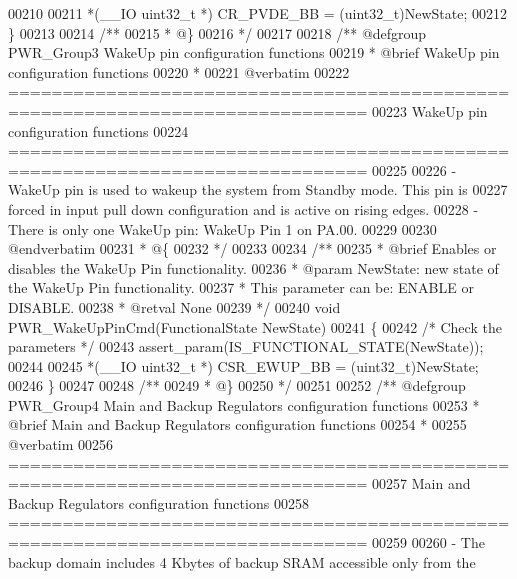 \begin{DoxyCode}
00210 
00211   *(\_\_IO uint32\_t *) CR_PVDE_BB = (uint32\_t)NewState;
00212 \}
00213 
00214 \textcolor{comment}{/**}
00215 \textcolor{comment}{  * @\}}
00216 \textcolor{comment}{  */}
00217 
00218 \textcolor{comment}{/** @defgroup PWR\_Group3 WakeUp pin configuration functions}
00219 \textcolor{comment}{ *  @brief   WakeUp pin configuration functions }
00220 \textcolor{comment}{ *}
00221 \textcolor{comment}{@verbatim   }
00222 \textcolor{comment}{ ===============================================================================}
00223 \textcolor{comment}{                    WakeUp pin configuration functions}
00224 \textcolor{comment}{ ===============================================================================  }
00225 \textcolor{comment}{}
00226 \textcolor{comment}{ - WakeUp pin is used to wakeup the system from Standby mode. This pin is }
00227 \textcolor{comment}{   forced in input pull down configuration and is active on rising edges.}
00228 \textcolor{comment}{ - There is only one WakeUp pin: WakeUp Pin 1 on PA.00.}
00229 \textcolor{comment}{}
00230 \textcolor{comment}{@endverbatim}
00231 \textcolor{comment}{  * @\{}
00232 \textcolor{comment}{  */}
00233 
00234 \textcolor{comment}{/**}
00235 \textcolor{comment}{  * @brief  Enables or disables the WakeUp Pin functionality.}
00236 \textcolor{comment}{  * @param  NewState: new state of the WakeUp Pin functionality.}
00237 \textcolor{comment}{  *         This parameter can be: ENABLE or DISABLE.}
00238 \textcolor{comment}{  * @retval None}
00239 \textcolor{comment}{  */}
00240 \textcolor{keywordtype}{void} PWR_WakeUpPinCmd(FunctionalState NewState)
00241 \{
00242   \textcolor{comment}{/* Check the parameters */}
00243   assert_param(IS\_FUNCTIONAL\_STATE(NewState));
00244 
00245   *(\_\_IO uint32\_t *) CSR_EWUP_BB = (uint32\_t)NewState;
00246 \}
00247 
00248 \textcolor{comment}{/**}
00249 \textcolor{comment}{  * @\}}
00250 \textcolor{comment}{  */}
00251 
00252 \textcolor{comment}{/** @defgroup PWR\_Group4 Main and Backup Regulators configuration functions}
00253 \textcolor{comment}{ *  @brief   Main and Backup Regulators configuration functions }
00254 \textcolor{comment}{ *}
00255 \textcolor{comment}{@verbatim   }
00256 \textcolor{comment}{ ===============================================================================}
00257 \textcolor{comment}{                    Main and Backup Regulators configuration functions}
00258 \textcolor{comment}{ ===============================================================================  }
00259 \textcolor{comment}{}
00260 \textcolor{comment}{ - The backup domain includes 4 Kbytes of backup SRAM accessible only from the }

\end{DoxyCode}
